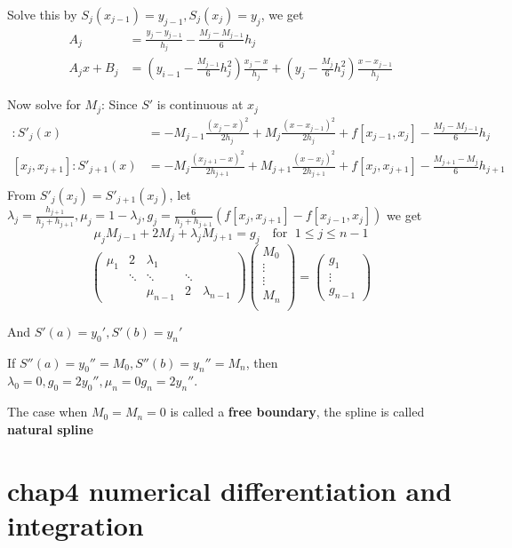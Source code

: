 \documentclass[11pt]{article}
\begin{document}
Solve this by \(S_j(x_{j-1})=y_{j-1},S_j(x_j)=y_j\), we get
\begin{align*}
A_j&=\frac{y_j-y_{j-1}}{h_j}-\frac{M_j-M_{j-1}}{6}h_j\\
A_jx+B_j&=(y_{i-1}-\frac{M_{j-1}}{6}h_j^2)\frac{x_j-x}{h_j}+ 
(y_j-\frac{M_j}{6}h_j^2)\frac{x-x_{j-1}}{h_j}
\end{align*}

Now solve for \(M_j\): Since \(S'\) is continuous at \(x_j\)
 \begin{align*}
[x_{j-1},x_j]:S'_j(x)&=-M_{j-1}\frac{(x_j-x)^2}{2h_j}+M_j\frac{(x-x_{j-1})^2}{2h_j}
                       +f[x_{j-1},x_j]-\frac{M_j-M_{j-1}}{6}h_j\\
[x_j,x_{j+1}]:S'_{j+1}(x)&=-M_j\frac{(x_{j+1}-x)^2}{2h_{j+1}}+M_{j+1}
\frac{(x-x_j)^2}{2h_{j+1}}+f[x_j,x_{j+1}]-\frac{M_{j+1}-M_j}{6}h_{j+1}\\
\end{align*}
From \(S'_j(x_j)=S'_{j+1}(x_j)\), let \(\lambda_j=\frac{h_{j+1}}{h_j+h_{j+1}},
   \mu_j=1-\lambda_j,g_j=\frac{6}{h_j+h_{j+1}}(f[x_j,x_{j+1}]-f[x_{j-1},x_j])\)
we get
\begin{equation*}
\mu_jM_{j-1}+2M_j+\lambda_jM_{j+1}=g_j\quad\text{for } \;1\le j\le n-1
\end{equation*}
\begin{equation*}
\begin{pmatrix}
\mu_1 & 2 & \lambda_1 &&\\
& \ddots &\ddots &\ddots &\\
&&\mu_{n-1}&2&\lambda_{n-1}
\end{pmatrix}
\begin{pmatrix}
M_0\\
\vdots\\
\vdots\\
M_n\\
\end{pmatrix}=
\begin{pmatrix}
g_1\\
\vdots\\
g_{n-1}
\end{pmatrix}
\end{equation*}

And  \(S'(a)=y_0',S'(b)=y_n'\)

If \(S''(a)=y_0''=M_0,S''(b)=y_n''=M_n\), then \(\lambda_0=0,g_0=2y_0'',\mu_n=0
   g_n=2y_n''\).

The case when \(M_0=M_n=0\) is called a \textbf{free boundary}, the spline is called
\textbf{natural spline}
\section{chap4 numerical differentiation and integration}
\label{sec:org8a76af3}
\end{document}
